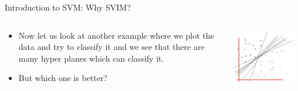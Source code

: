 \documentclass[aspectratio=169, 14pt]{beamer}
\begin{document}
\begin{frame}[t]{Introduction to SVM: Why SVIM?}
\begin{columns}
	\begin{column}{0.55\textwidth}
        \begin{itemize}
          \itemsep1em 
	  \item Now let us look at another example where we plot the data and try to classify it and we see that there are many hyper planes which can classify it.
         \item But which one is better?
	\end{itemize}
	\end{column}
	\begin{column}{0.45\textwidth}
		\vskip-0.5cm
		\includegraphics[width=0.9\textwidth]{SVM_NonLinear_Images/AIML_SVM_IMG1.png}
		\end{column}
\end{columns}

\end{frame}
\end{document}
